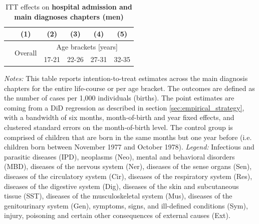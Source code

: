 \documentclass[11pt, a4paper, draft]{article} %
\begin{document}
\newpage
{} 
\vspace*{\fill}
\begin{table}[H] \centering 
	\begin{threeparttable} \centering \caption{ITT effects on \textbf{hospital admission and main diagnoses chapters (men)}}\label{tab: ITT_across_chapters_per_age_group_men}
		{\def\sym#1{\ifmmode^{#1}\else\(^{#1}\)\fi} 
			\begin{tabular}{l*{5}{c}}
				\toprule 
				&\multicolumn{1}{c}{(1)}&\multicolumn{1}{c}{(2)}&\multicolumn{1}{c}{(3)}&\multicolumn{1}{c}{(4)}&\multicolumn{1}{c}{(5)}\\
				\midrule
				&\multirow{2}{*}{Overall} & \multicolumn{4}{c}{Age brackets [years]} \\ 
				\cmidrule(lr){3-6}
				&&\multicolumn{1}{c}{17-21}&\multicolumn{1}{c}{22-26}&\multicolumn{1}{c}{27-31}&\multicolumn{1}{c}{32-35}\\
				
				\midrule
				
				
				
				\bottomrule 
		\end{tabular}}
	\end{threeparttable} 
	\begin{minipage}{0.9\linewidth}
		\scriptsize \emph{Notes:} This table reports intention-to-treat estimates across the main diagnosis chapters for the entire life-course or per age bracket. The outcomes are defined as the number of cases per 1,000 individuals (births). The point estimates are coming from a DiD regression as described in section \ref{sec:empirical_strategy}, with a bandwidth of six months, month-of-birth and year fixed effects, and clustered standard errors on the month-of-birth level. The control group is comprised of children that are born in the same months but one year before (i.e. children born between November 1977 and October 1978).\newline
		\emph{Legend:} Infectious and parasitic diseases (IPD), neoplasms (Neo), mental and behavioral disorders (MBD), diseases of the nervous system (Ner), diseases of the sense organs (Sen), diseases of the circulatory system (Cir), diseases of the respiratory system (Res), diseases of the digestive system (Dig), diseases of the skin and subcutaneous tissue (SST), diseases of the musculoskeletal system (Mus), diseases of the genitourinary system (Gen), symptoms, signs, and ill-defined conditions (Sym), injury, poisoning and certain other consequences of external causes (Ext).
	\end{minipage}
\end{table} 
\vspace*{\fill}\clearpage 
\restoregeometry
\end{document}
